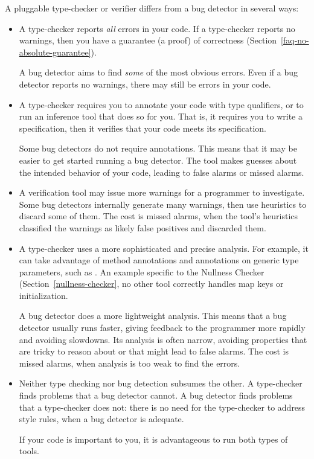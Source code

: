 A pluggable type-checker or verifier
differs from a bug detector in several ways:
\begin{itemize}
\item
  A type-checker reports \emph{all} errors in your code.  If a type-checker
  reports no warnings, then you have a guarantee (a proof) of correctness
  (Section~\ref{faq-no-absolute-guarantee}).

  A bug detector aims to find \emph{some} of the most obvious errors.  Even
  if a bug detector reports no warnings, there may still be errors in your
  code.

\item
  A type-checker requires you to annotate your code with type qualifiers,
  or to run an inference tool that does so for you.  That is, it requires
  you to write a specification, then it verifies that your code meets its
  specification.

  Some bug detectors do not require annotations.  This means that it may be
  easier to get started running a bug detector.  The tool makes guesses
  about the intended behavior of your code, leading to false alarms or
  missed alarms.

\item
  A verification tool may issue more warnings for a programmer to
  investigate.  Some bug detectors internally generate many warnings, then
  use heuristics to discard some of them.  The cost is missed alarms, when
  the tool's heuristics classified the warnings as likely false positives
  and discarded them.

\item
  A type-checker uses a more sophisticated and precise analysis.  For
  example, it can take advantage of method annotations and annotations on
  generic type parameters, such as .  An
  example specific to the Nullness Checker (Section~\ref{nullness-checker},
  no other tool correctly handles map keys or initialization.

  A bug detector does a more lightweight analysis.  This means that a bug
  detector usually runs faster, giving feedback to the programmer more
  rapidly and avoiding slowdowns.  Its analysis is often narrow, avoiding
  properties that are tricky to reason about or that might lead to false
  alarms.  The cost is missed alarms, when analysis is too weak to find the
  errors.

\item
  Neither type checking nor bug detection subsumes the other.  A
  type-checker finds problems that a bug detector cannot.  A bug detector
  finds problems that a type-checker does not:  there is no need for the
  type-checker to address style rules, when a bug detector is adequate.

  If your code is important to you, it is advantageous to run both types of
  tools.

\end{itemize}

